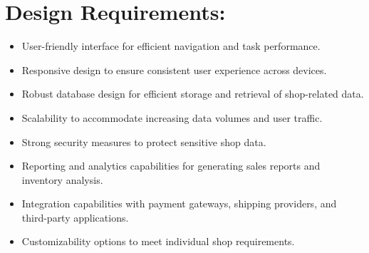 \section{Design Requirements:}
\begin{itemize}
\item User-friendly interface for efficient navigation and task performance.
\item Responsive design to ensure consistent user experience across devices.
\item Robust database design for efficient storage and retrieval of shop-related data.
\item Scalability to accommodate increasing data volumes and user traffic.
\item Strong security measures to protect sensitive shop data.
\item Reporting and analytics capabilities for generating sales reports and inventory analysis.
\item Integration capabilities with payment gateways, shipping providers, and third-party applications.
\item Customizability options to meet individual shop requirements.
\end{itemize}
